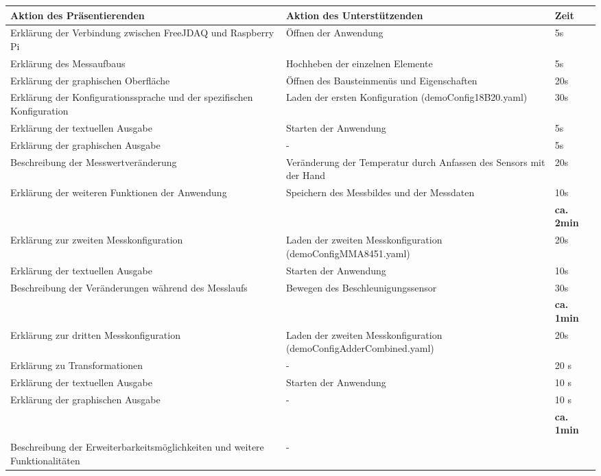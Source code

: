 \documentclass[parskip=full]{scrartcl}
\begin{document}
\begin{table}[t]
\begin{center}
\begin{tabular}{ | p{7cm} | p{7cm} | p{1cm} | }
\hline
\textbf{Aktion des Präsentierenden} & \textbf{Aktion des Unterstützenden} & \textbf{Zeit} \\
\hline
Erklärung der Verbindung zwischen FreeJDAQ und Raspberry Pi & Öffnen der Anwendung & 5s \\ \hline
Erklärung des Messaufbaus & Hochheben der einzelnen Elemente & 5s\\ \hline
Erklärung der graphischen Oberfläche & Öffnen des Bausteinmenüs und Eigenschaften &  20s \\ \hline
Erklärung der Konfigurationssprache und der spezifischen Konfiguration & Laden der ersten Konfiguration 			                     (demoConfig18B20.yaml) & 30s \\ \hline
Erklärung der textuellen Ausgabe & Starten der Anwendung & 5s \\  \hline
Erklärung der graphischen Ausgabe & - & 5s \\ \hline
Beschreibung der Messwertveränderung & Veränderung der Temperatur durch Anfassen des Sensors mit der Hand & 20s \\ \hline
Erklärung der weiteren Funktionen der Anwendung & Speichern des Messbildes und der Messdaten & 10s \\ \hline
&& \textbf{ca. 2min}  \\ \hline 
Erklärung zur zweiten Messkonfiguration & Laden der zweiten Messkonfiguration (demoConfigMMA8451.yaml) & 20s\\ \hline
Erklärung der textuellen Ausgabe & Starten der Anwendung & 10s \\  \hline
Beschreibung der Veränderungen während des Messlaufs & Bewegen des Beschleunigungssensor & 30s \\ \hline
&& \textbf{ca. 1min} \\ \hline
Erklärung zur dritten Messkonfiguration & Laden der zweiten Messkonfiguration (demoConfigAdderCombined.yaml) & 20s \\ \hline
Erklärung zu Transformationen & - & 20 s\\ \hline
Erklärung der textuellen Ausgabe & Starten der Anwendung & 10 s\\  \hline
Erklärung der graphischen Ausgabe & - & 10 s\\ \hline
&& \textbf{ca. 1min} \\ \hline
Beschreibung der Erweiterbarkeitsmöglichkeiten und weitere Funktionalitäten & - &\\ \hline

                \end{tabular}
            \end{center}
        \end{table}


\renewcommand*{\glossarysection}[2][]{}	%
\printnoidxglossaries				%
\end{document}
